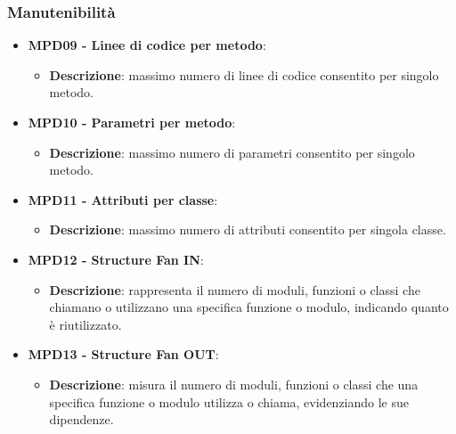 \documentclass[10pt]{article}
\begin{document}
\begin{justify}
\subsubsection{Manutenibilità}
\begin{itemize}
    \item \textbf{MPD09 - Linee di codice per metodo}:
      \begin{itemize}
        \item \textbf{Descrizione}: massimo numero di linee di codice consentito per singolo metodo.
      \end{itemize}
    \item \textbf{MPD10 - Parametri per metodo}:
      \begin{itemize}
        \item \textbf{Descrizione}: massimo numero di parametri consentito per singolo metodo.
      \end{itemize}
    \item \textbf{MPD11 - Attributi per classe}:
      \begin{itemize}
        \item \textbf{Descrizione}: massimo numero di attributi consentito per singola classe.
      \end{itemize}
    \item \textbf{MPD12 - Structure Fan IN}:
      \begin{itemize}
        \item \textbf{Descrizione}: rappresenta il numero di moduli, funzioni o classi che chiamano o utilizzano una specifica funzione o modulo, indicando quanto è riutilizzato.
      \end{itemize}
    \item \textbf{MPD13 - Structure Fan OUT}:
      \begin{itemize}
        \item \textbf{Descrizione}: misura il numero di moduli, funzioni o classi che una specifica funzione o modulo utilizza o chiama, evidenziando le sue dipendenze.
      \end{itemize}
\end{itemize}


\end{justify}
\end{document}
